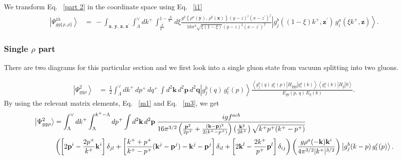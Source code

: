 \documentclass[aps,prd,amsmath,amssymb,nofootinbib]{revtex4-2}
\numberwithin{equation}{section}
\begin{document}
We transform Eq.~ \eqref{part 2} in the coordinate space using Eq.~ \eqref{i1}
\begin{align}\label{gg_rhorho}
\left|\Psi_{gg\{\rho,\rho\}}^{1b}\right\rangle &=\,-\int_{\mathbf{x},\,\mathbf{y},\,\mathbf{z},\,\mathbf{z}^{\prime}}\int_{\Lambda}^{\vee}dk^{+}\,\int_{\frac{\Lambda}{k^{+}}}^{1-\frac{\Lambda}{k^{+}}}d\xi\frac{g^{2}\left\{ \rho^{a}(\mathbf{y}),\,\rho^{b}(\mathbf{x})\right\} (y-z)^{i}(x-z^{\prime})^{j}}{16\pi^{3}\sqrt{\xi(1-\xi)}(y-z)^{2}(x-z^{\prime})^{2}}\left|g_{j}^{b}((1-\xi)k^{+},\mathbf{z}^{\prime})\, g_{i}^{a}(\xi k^{+},\mathbf{z})\right\rangle .
\end{align}

\subsubsection{Single $\rho$ part}
There are two diagrams for this particular section and we first look into a single gluon state from vacuum splitting into two gluons.
\begin{figure}[h]
\end{figure}
\begin{align}\label{ggtwo}
\left|\Psi_{gg\rho}^{2}\right\rangle & = \,\frac{1}{2}\int_{\Lambda}^{\vee}dk^{+}\, dp^{+}\, dq^{+}\,\int d^{2}\mathbf{k}\, d^{2}\mathbf{p}\, d^{2}\mathbf{q}\left|g_{j}^{b}(q)\, g_{l}^{c}(p)\right\rangle \frac{\left\langle g_{j}^{b}(q)\, g_{l}^{c}(p)\left|H_{ggg}\right|g_{i}^{a}(k)\right\rangle \left\langle g_{i}^{a}(k)\left|H_{g}\right|0\right\rangle }{E_{gg}(p,\, q)\, E_{g}(k)}.
\end{align}
By using the relevant matrix elements, Eq.~ \eqref{m1} and Eq.~ \eqref{m3}, we get
\begin{align}\label{ggmid}
\left|\Psi_{gg\rho}^{2}\right\rangle 
&=\int_{\Lambda}^{\vee}dk^{+}\int_{\Lambda}^{k^{+}-\Lambda}dp^{+}\int d^{2}\mathbf{k}\,d^{2}\mathbf{p}\:\frac{igf^{acb}}{16\pi^{3/2}\left(\frac{\mathbf{p}^{2}}{2p^{+}}+\frac{(\mathbf{k}-\mathbf{p})^{2}}{2(k^{+}-p^{+})}\right)\left(\frac{\mathbf{k}^{2}}{2k^{+}}\right)\sqrt{k^{+}p^{+}(k^{+}-p^{+})}}\notag \\ &
\left(\left[2\mathbf{p}^{i}-\frac{2p^{+}}{k^{+}}\mathbf{k}^{i}\right]\delta_{jl}+\left[\frac{k^{+}+p^{+}}{k^{+}-p^{+}}(\mathbf{k}^{j}-\mathbf{p}^{j})-\mathbf{k}^{j}-\mathbf{p}^{j}\right]\delta_{il}+\left[2\mathbf{k}^{l}-\frac{2k^{+}}{p^{+}}\mathbf{p}^{l}\right]\delta_{ij}\right)
\left(\frac{g\rho^{a}(-\mathbf{k})\mathbf{k}^{i}}{4\pi^{3/2}|k^{+}|^{3/2}}\right)\left|g_{j}^{b}(k-p)\, g_{l}^{c}(p)\right\rangle. 
\end{align}
\end{document}
